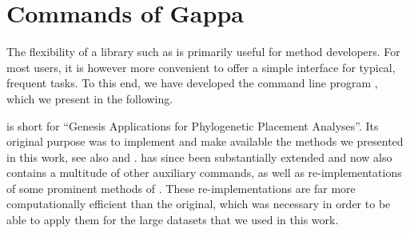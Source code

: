 


\section{Commands of Gappa}
\label{ch:PipelineImplementation:sub:Commands}


The flexibility of a library such as  is primarily useful for method developers.
For most users, it is however more convenient to offer a simple interface for typical, frequent tasks.
To this end, we have developed the command line program , which we present in the following.

 is short for ``Genesis Applications for Phylogenetic Placement Analyses''.
Its original purpose was to implement and make available the methods we presented in this work,
see also  and .
 has since been substantially extended and 
now also contains a multitude of other auxiliary commands,
as well as re-implementations of some prominent methods of  \cite{Matsen2010}.
These re-implementations are far more computationally efficient than the original,
which was necessary in order to be able to apply them for the large datasets that we used in this work.

